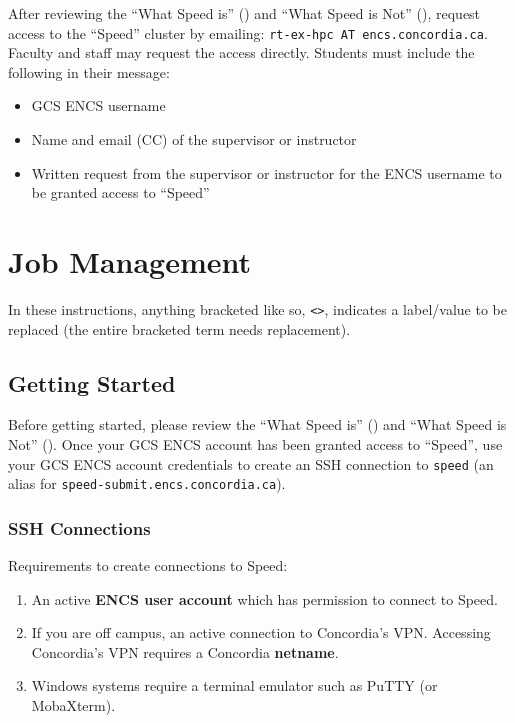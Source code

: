 \documentclass{easychair}
\begin{document}
After reviewing the ``What Speed is'' () and
``What Speed is Not'' (), request access to the ``Speed'' 
cluster by emailing: \texttt{rt-ex-hpc AT encs.concordia.ca}.
%
Faculty and staff may request the access directly.
Students must include the following in their message:

\begin{itemize} 
	\item GCS ENCS username
	\item Name and email (CC) of the supervisor or instructor
	\item Written request from the supervisor or instructor for the ENCS username to be granted access to ``Speed''
\end{itemize}

\section{Job Management}
\label{sect:job-management}

In these instructions, anything bracketed like so, \verb+<>+, indicates a
label/value to be replaced (the entire bracketed term needs replacement).

\subsection{Getting Started}

Before getting started, please review the ``What Speed is'' ()
and ``What Speed is Not'' ().
Once your GCS ENCS account has been granted access to ``Speed'',
use your GCS ENCS account credentials to create an SSH connection to 
\texttt{speed} (an alias for \texttt{speed-submit.encs.concordia.ca}). 

\subsubsection{SSH Connections}

Requirements to create connections to Speed:
\begin{enumerate}
	\item
An active \textbf{ENCS user account} which has permission to connect to Speed.
	\item
If you are off campus, an active connection to Concordia's VPN. Accessing Concordia's VPN requires a Concordia \textbf{netname}. 
	\item
Windows systems require a terminal emulator such as PuTTY (or MobaXterm). 
\end{enumerate}
\end{document}
